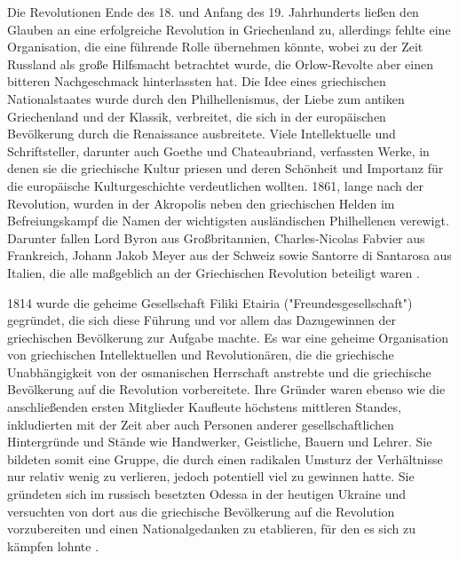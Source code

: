 \documentclass[preprint]{geomorphica} %
\begin{document}
Die Revolutionen Ende des 18. und Anfang des 19. Jahrhunderts ließen den Glauben an eine erfolgreiche Revolution in Griechenland zu, allerdings fehlte eine Organisation, die eine führende Rolle übernehmen könnte, wobei zu der Zeit Russland als große Hilfsmacht betrachtet wurde, die Orlow-Revolte aber einen bitteren Nachgeschmack hinterlassten hat.
Die Idee eines griechischen Nationalstaates wurde durch den Philhellenismus, der Liebe zum antiken Griechenland und der Klassik, verbreitet, die sich in der europäischen Bevölkerung durch die Renaissance ausbreitete.
Viele Intellektuelle und Schriftsteller, darunter auch Goethe und Chateaubriand, verfassten Werke, in denen sie die griechische Kultur priesen und deren Schönheit und Importanz für die europäische Kulturgeschichte verdeutlichen wollten.
1861, lange nach der Revolution, wurden in der Akropolis neben den griechischen Helden im Befreiungskampf die Namen der wichtigsten ausländischen Philhellenen verewigt.
Darunter fallen Lord Byron aus Großbritannien, Charles-Nicolas Fabvier aus Frankreich, Johann Jakob Meyer aus der Schweiz sowie Santorre di Santarosa aus Italien, die alle maßgeblich an der Griechischen Revolution beteiligt waren \cite{Zelepos2015, Konstantinou2012, Clair2008}.

1814 wurde die geheime Gesellschaft Filiki Etairia ("Freundesgesellschaft") gegründet, die sich diese Führung und vor allem das Dazugewinnen der griechischen Bevölkerung zur Aufgabe machte.
Es war eine geheime Organisation von griechischen Intellektuellen und Revolutionären, die die griechische Unabhängigkeit von der osmanischen Herrschaft anstrebte und die griechische Bevölkerung auf die Revolution vorbereitete.
Ihre Gründer waren ebenso wie die anschließenden ersten Mitglieder Kaufleute höchstens mittleren Standes, inkludierten mit der Zeit aber auch Personen anderer gesellschaftlichen Hintergründe und Stände wie Handwerker, Geistliche, Bauern und Lehrer.
Sie bildeten somit eine Gruppe, die durch einen radikalen Umsturz der Verhältnisse nur relativ wenig zu verlieren, jedoch potentiell viel zu gewinnen hatte.
Sie gründeten sich im russisch besetzten Odessa in der heutigen Ukraine und versuchten von dort aus die griechische Bevölkerung auf die Revolution vorzubereiten und einen Nationalgedanken zu etablieren, für den es sich zu kämpfen lohnte \cite{Zelepos2015, Dakin1952, Konstantinou2012, Clair2008}.
\end{document}
